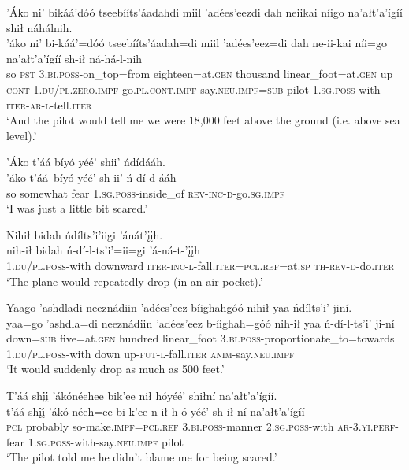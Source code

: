 \largerpage
\ea\label{ex:text9-4-9}
’Áko ni’ bikáá’dóó tseebííts’áadahdi miil ’adées’eezdi dah neiikai níigo na’ałt’a’ígíí shił náhálnih.\\
\gll ’áko	ni’	bi-káá’=dóó	tseebííts’áadah=di	miil	’adées’eez=di	dah	ne-ii-kai	níi=go	na’ałt’a’ígíí	sh-ił	ná-há-l-nih\\
     so	\textsc{pst}	3.\textsc{bi}.\textsc{poss}-on\_top=from	eighteen=at.\textsc{gen}	thousand	linear\_foot=at.\textsc{gen}	up	\textsc{cont}-1.\textsc{du}/\textsc{pl}.\textsc{zero}.\textsc{impf}-go.\textsc{pl}.\textsc{cont}.\textsc{impf}	say.\textsc{neu}.\textsc{impf}=\textsc{sub}	pilot	1.\textsc{sg}.\textsc{poss}-with	\textsc{iter}-\textsc{ar}-\textsc{l}-tell.\textsc{iter}\\
\glt `And the pilot would tell me we were 18,000 feet above the ground (i.e. above sea level).'
\z

\ea\label{ex:text9-4-10}
’Áko t’áá bíyó yéé’ shii’ ńdídááh.\\
\gll ’áko	t’áá~{bíyó}	yéé’	sh-ii’	ń-dí-d-ááh\\
     so	somewhat	fear	1.\textsc{sg}.\textsc{poss}-inside\_of	\textsc{rev}-\textsc{inc}-\textsc{d}-go.\textsc{sg}.\textsc{impf}\\
\glt `I was just a little bit scared.'
\z

\ea\label{ex:text9-4-11}
Nihił bidah ńdílts’i’iigi ’ánát’įįh.\\
\gll nih-ił	bidah	ń-dí-l-ts’i’=ii=gi	’á-ná-t-’įįh\\
     1.\textsc{du}/\textsc{pl}.\textsc{poss}-with	downward	\textsc{iter}-\textsc{inc}-\textsc{l}-fall.\textsc{iter}=\textsc{pcl}.\textsc{ref}=at.\textsc{sp}	\textsc{th}-\textsc{rev}-\textsc{d}-do.\textsc{iter}\\
\glt `The plane would repeatedly drop (in an air pocket).'
\z

\ea\label{ex:text9-4-12}
Yaago ’ashdladi neeznádiin ’adées’eez bíighahgóó nihił yaa ńdílts’i’ jiní.\\
\gll yaa=go	’ashdla=di	neeznádiin	’adées’eez	b-íighah=góó	nih-ił	yaa	ń-dí-l-ts’i’	ji-ní\\
     down=\textsc{sub}	five=at.\textsc{gen}	hundred	linear\_foot	3.\textsc{bi}.\textsc{poss}-proportionate\_to=towards	1.\textsc{du}/\textsc{pl}.\textsc{poss}-with	down	up-\textsc{fut}-\textsc{l}-fall.\textsc{iter}	\textsc{anim}-say.\textsc{neu}.\textsc{impf}\\
\glt `It would suddenly drop as much as 500 feet.'
\z

\ea\label{ex:text9-4-13}
T’áá shį́į́ ’ákónéehee bik’ee nił hóyéé’ shiłní na’ałt’a’ígíí.\\
\gll t’áá	shį́į́	’ákó-néeh=ee	bi-k’ee	n-ił	h-ó-yéé’	sh-ił-ní	na’ałt’a’ígíí\\
     \textsc{pcl}	probably	so-make.\textsc{impf}=\textsc{pcl}.\textsc{ref}	3.\textsc{bi}.\textsc{poss}-manner	2.\textsc{sg}.\textsc{poss}-with	\textsc{ar}-3.\textsc{yi}.\textsc{perf}-fear	1.\textsc{sg}.\textsc{poss}-with-say.\textsc{neu}.\textsc{impf}	pilot\\
\glt `The pilot told me he didn't blame me for being scared.'
\z

